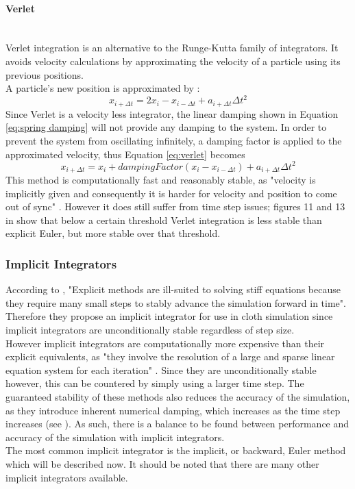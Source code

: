 \paragraph{Verlet}\leavevmode\\
Verlet integration is an alternative to the Runge-Kutta family of integrators. It avoids velocity calculations by approximating the velocity of a particle using its previous positions.
\\A particle's new position is approximated by \parencite[2]{Mongus2012}:
\begin{equation}
\label{eq:verlet}
  x_{i + \Delta t} = 2x_{i} - x_{i - \Delta t} + a_{i + \Delta t}\Delta t^{2}
\end{equation}
Since Verlet is a velocity less integrator, the linear damping shown in Equation \ref{eq:spring damping} will not provide any damping to the system. In order to prevent the system from oscillating infinitely, a damping factor is applied to the approximated velocity, thus Equation \ref{eq:verlet} becomes
\begin{equation}
\label{eq:dampened verlet}
  x_{i + \Delta t} = x_{i} + dampingFactor(x_{i} - x_{i - \Delta t}) + a_{i + \Delta t}\Delta t^{2}
\end{equation}
This method is computationally fast and reasonably stable, as "velocity is implicitly given and consequently it is harder for velocity and position to come out of sync" \parencite[1]{Jakobsen2005}. However it does still suffer from time step issues; figures 11 and 13 in \textcite[14-15]{Wacker2005a} show that below a certain threshold Verlet integration is less stable than explicit Euler, but more stable over that threshold.

\subsubsection{Implicit Integrators}
According to \textcite[1]{Baraff1998}, "Explicit methods are ill-suited to solving stiff equations because they require many small steps to stably advance the simulation forward in time". Therefore they propose an implicit integrator for use in cloth simulation since implicit integrators are unconditionally stable regardless of step size. 
\\However implicit integrators are computationally more expensive than their explicit equivalents, as "they involve the resolution of a large and sparse linear equation system for each iteration" \parencite[4]{Volino2005}. Since they are unconditionally stable however, this can be countered by simply using a larger time step. The guaranteed stability of these methods also reduces the accuracy of the simulation, as they introduce inherent numerical damping, which increases as the time step increases (see \textcite[4]{Volino2001}). As such, there is a balance to be found between performance and accuracy of the simulation with implicit integrators.
\\The most common implicit integrator is the implicit, or backward, Euler method which will be described now. It should be noted that there are many other implicit integrators available.

